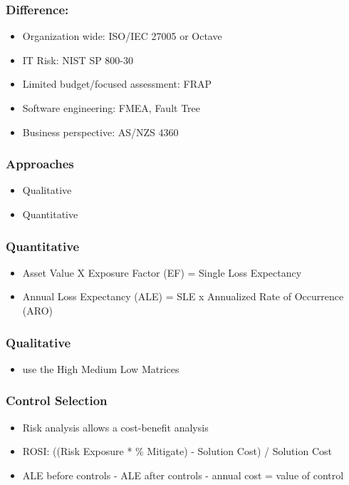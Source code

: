 \documentclass[11pt]{article}
\begin{document}
\subsubsection{Difference:}
\label{sec:org353df11}
\begin{itemize}
\item Organization wide: ISO/IEC 27005 or Octave
\item IT Risk: NIST SP 800-30
\item Limited budget/focused assessment: FRAP
\item Software engineering: FMEA, Fault Tree
\item Business perspective: AS/NZS 4360
\end{itemize}
\subsubsection{Approaches}
\label{sec:org4171c0f}
\begin{itemize}
\item Qualitative
\item Quantitative
\end{itemize}
\subsubsection{Quantitative}
\label{sec:org714b648}
\begin{itemize}
\item Asset Value X Exposure Factor (EF) = Single Loss Expectancy
\item Annual Loss Expectancy (ALE) = SLE x Annualized Rate of Occurrence (ARO)
\end{itemize}
\subsubsection{Qualitative}
\label{sec:orgd251ae5}
\begin{itemize}
\item use the High Medium Low Matrices
\end{itemize}
\subsubsection{Control Selection}
\label{sec:org10f4a39}
\begin{itemize}
\item Risk analysis allows a cost-benefit analysis
\item ROSI: ((Risk Exposure * \% Mitigate) - Solution Cost) / Solution Cost
\item ALE before controls - ALE after controls - annual cost = value of control
\end{itemize}
\end{document}
